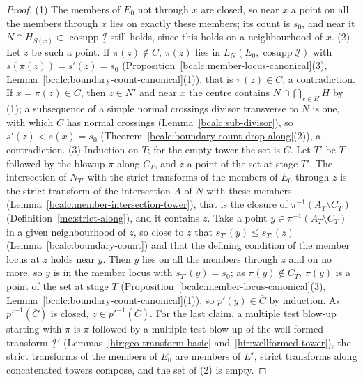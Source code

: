 \begin{proof}
\mixedleanok
(1) The members of \(E_0\) not through \(x\) are closed, so near \(x\) a point on all the members through \(x\) lies on exactly these members; its count is \(s_0\), and
near it \(N\cap H_{S(x)}\subset\operatorname{cosupp}\underline{\mathcal I}\) still holds, since this holds on a neighbourhood of \(x\).
(2) Let \(z\) be such a point. If \(\pi(z)\notin C\), \(\pi(z)\) lies in \(L_N(E_0,\operatorname{cosupp}\underline{\mathcal I})\) with \(s(\pi(z))=s'(z)=s_0\)
(Proposition~\ref{bcalc:member-locus-canonical}(3), Lemma~\ref{bcalc:boundary-count-canonical}(1)), that is \(\pi(z)\in C\), a contradiction. If \(x=\pi(z)\in C\), then
\(z\in N'\) and near \(x\) the centre contains \(N\cap\bigcap_{x\in H}H\) by (1); a subsequence of a simple normal crossings divisor transverse to \(N\) is one, with which
\(C\) has normal crossings (Lemma~\ref{bcalc:sub-divisor}), so \(s'(z)<s(x)=s_0\) (Theorem~\ref{bcalc:boundary-count-drop-along}(2)), a contradiction.
(3) Induction on \(T\); for the empty tower the set is \(C\). Let \(T'\) be \(T\) followed by the blowup \(\pi\) along \(C_T\), and \(z\) a point of the set at stage \(T'\). The
intersection of \(N_{T'}\) with the strict transforms of the members of \(E_0\) through \(z\) is the strict transform of the intersection \(A\) of \(N\) with these members
(Lemma~\ref{bcalc:member-intersection-tower}), that is the closure of \(\pi^{-1}(A_T\setminus C_T)\) (Definition~\ref{mc:strict-along}), and it contains \(z\). Take a point
\(y\in\pi^{-1}(A_T\setminus C_T)\) in a given neighbourhood of \(z\), so close to \(z\) that \(s_{T'}(y)\le s_{T'}(z)\) (Lemma~\ref{bcalc:boundary-count}) and that the defining condition
of the member locus at \(z\) holds near \(y\). Then \(y\) lies on all the members through \(z\) and on no more, so \(y\) is in the member locus with \(s_{T'}(y)=s_0\); as
\(\pi(y)\notin C_T\), \(\pi(y)\) is a point of the set at stage \(T\) (Proposition~\ref{bcalc:member-locus-canonical}(3), Lemma~\ref{bcalc:boundary-count-canonical}(1)), so
\(p'(y)\in\overline C\) by induction. As \(p'^{-1}(\overline C)\) is closed, \(z\in p'^{-1}(\overline C)\). For the last claim, a multiple test blow-up starting with \(\pi\) is \(\pi\)
followed by a multiple test blow-up of the well-formed transform \(\underline{\mathcal I}'\) (Lemmas~\ref{hir:geo-transform-basic} and~\ref{hir:wellformed-tower}), the strict
transforms of the members of \(E_0\) are members of \(E'\), strict transforms along concatenated towers compose, and the set of (2) is empty.
\end{proof}

